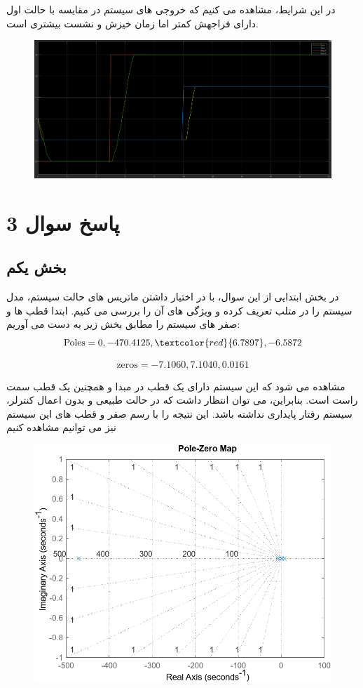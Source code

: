  در این شرایط، مشاهده می کنیم که خروجی های سیستم در مقایسه با حالت اول دارای فراجهش کمتر اما زمان خیزش و نشست بیشتری است.
 \begin{figure}
 	\centering
 	\includegraphics[width=1\linewidth]{../img/Q2_output_updated}
 	\caption{}
 	\label{fig:q2outputupdated}
 \end{figure}
 

\section{پاسخ سوال 3}
\subsection{بخش یکم}
در بخش ابتدایی از این سوال، با در اختیار داشتن ماتریس های حالت سیستم، مدل سیستم را در متلب تعریف کرده و ویژگی های آن را بررسی می کنیم. 
ابتدا قطب ها و صفر های سیستم را مطابق بخش زیر به دست می آوریم:
\[
\text{Poles} = 0, -470.4125, \textcolor{red}{6.7897}, -6.5872
\]

\[
\text{zeros} = -7.1060, 7.1040, 0.0161
\]

مشاهده می شود که این سیستم دارای یک قطب در مبدا و همچنین یک قطب سمت راست است. بنابراین، می توان انتظار داشت که در حالت طبیعی و بدون اعمال کنترلر، سیستم رفتار پایداری نداشته باشد.
این نتیجه را با رسم صفر و قطب های این سیستم نیز می توانیم مشاهده کنیم
\begin{figure}
	\centering
	\includegraphics[width=0.7\linewidth]{../img/continues_Poles}
	\caption{}
	\label{fig:continuespoles}
\end{figure}

